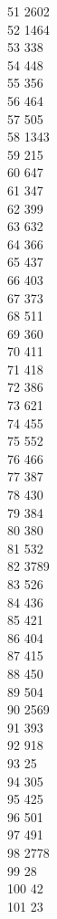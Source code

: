 { 51	2602 \\
 52	1464 \\
 53	338 \\
 54	448 \\
 55	356 \\
 56	464 \\
 57	505 \\
 58	1343 \\
 59	215 \\
 60	647 \\
 61	347 \\
 62	399 \\
 63	632 \\
 64	366 \\
 65	437 \\
 66	403 \\
 67	373 \\
 68	511 \\
 69	360 \\
 70	411 \\
 71	418 \\
 72	386 \\
 73	621 \\
 74	455 \\
 75	552 \\
 76	466 \\
 77	387 \\
 78	430 \\
 79	384 \\
 80	380 \\
 81	532 \\
 82	3789 \\
 83	526 \\
 84	436 \\
 85	421 \\
 86	404 \\
 87	415 \\
 88	450 \\
 89	504 \\
 90	2569 \\
 91	393 \\
 92	918 \\
 93	25 \\
 94	305 \\
 95	425 \\
 96	501 \\
 97	491 \\
 98	2778 \\
 99	28 \\
 100	42 \\
 101	23 \\
}

